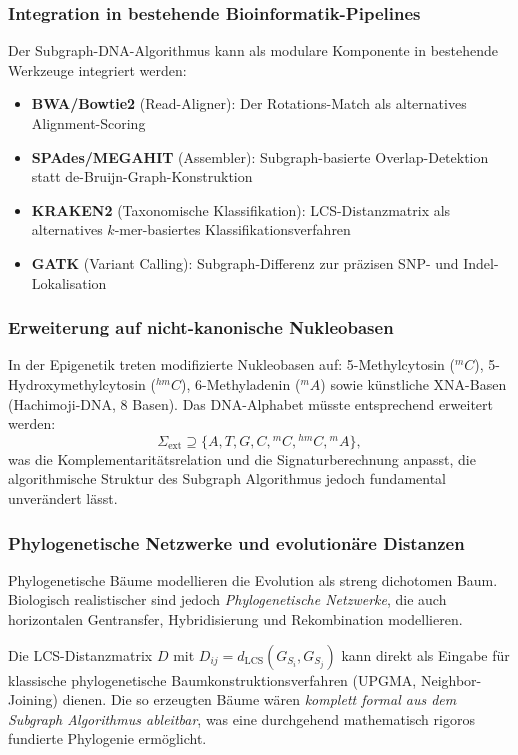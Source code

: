 ﻿\documentclass[a4paper,12pt]{article}
\theoremstyle{definition}
\begin{document}
\subsubsection{Integration in bestehende Bioinformatik-Pipelines}

Der Subgraph-DNA-Algorithmus kann als modulare Komponente in bestehende
Werkzeuge integriert werden:
\begin{itemize}
	\item \textbf{BWA/Bowtie2} (Read-Aligner): Der Rotations-Match als
	alternatives Alignment-Scoring
	\item \textbf{SPAdes/MEGAHIT} (Assembler): Subgraph-basierte
	Overlap-Detektion statt de-Bruijn-Graph-Konstruktion
	\item \textbf{KRAKEN2} (Taxonomische Klassifikation): LCS-Distanzmatrix
	als alternatives $k$-mer-basiertes Klassifikationsverfahren
	\item \textbf{GATK} (Variant Calling): Subgraph-Differenz zur
	präzisen SNP- und Indel-Lokalisa\-tion
\end{itemize}

\subsubsection{Erweiterung auf nicht-kanonische Nukleobasen}

In der Epigenetik treten modifizierte Nukleobasen auf:
5-Methylcytosin (${}^m C$), 5-Hydroxy\-methylcytosin (${}^{hm}C$),
6-Methyladenin (${}^m A$) sowie künstliche XNA-Basen (Hachimoji-DNA, 8 Basen).
Das DNA-Alphabet müsste entsprechend erweitert werden:
\[
\Sigma_{\text{ext}} \supseteq \{A, T, G, C, {}^mC, {}^{hm}C, {}^mA\},
\]
was die Komplementaritätsrelation und die Signaturberechnung anpasst,
die algorithmische Struktur des Subgraph Algorithmus jedoch fundamental unverändert lässt.

\subsubsection{Phylogenetische Netzwerke und evolutionäre Distanzen}

Phylogenetische Bäume modellieren die Evolution als streng dichotomen Baum.
Biologisch realistischer sind jedoch \textit{Phylogenetische Netzwerke},
die auch horizontalen Gentransfer, Hybridisierung und Rekombination modellieren.

Die LCS-Distanzmatrix $D$ mit $D_{ij} = d_{\mathrm{LCS}}(G_{S_i}, G_{S_j})$
kann direkt als Eingabe für klassische phylogenetische Baumkonstruktionsverfahren
(UPGMA, Neighbor-Joining) dienen. Die so erzeugten Bäume wären
\textit{komplett formal aus dem Subgraph Algorithmus ableitbar}, was eine
durchgehend mathematisch rigoros fundierte Phylogenie ermöglicht.
\end{document}
